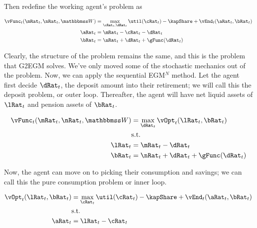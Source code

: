 \documentclass[\econtexRoot/HAFiscal]{subfiles}
\begin{document}
Then redefine the working agent's problem as

\begin{equation}
    \begin{split}
        \vFunc_{t}(\mRat_{t}, \nRat_{t}, \Work) & = \max_{\cRat_{t},
            \dRat_{t}} \util(\cRat_{t})  - \kapShare + \vEnd_{t}(\aRat_{t},
        \bRat_{t}) \\
        \aRat_{t} & = \mRat_{t} - \cRat_{t} - \dRat_{t} \\
        \bRat_{t} & = \nRat_{t} + \dRat_{t} + \gFunc(\dRat_{t}) \\
    \end{split}
\end{equation}



Clearly, the structure of the problem remains the same, and this is the problem
that G2EGM solves. We've only moved some
of the stochastic mechanics out of the problem. Now, we can apply the
sequential EGM$^N$ method. Let the agent first decide $\dRat_{t}$, the deposit
amount into their retirement; we will call this the deposit problem, or outer loop. Thereafter, the
agent will have net liquid assets
of $\lRat_{t}$ and pension assets of $\bRat_{t}$.

\begin{equation}
    \begin{split}
        \vFunc_{t}(\mRat_{t}, \nRat_{t}, \Work) & = \max_{\dRat_{t}}
        \vOpt_{t}(\lRat_{t}, \bRat_{t}) \\
        & \text{s.t.} \\
        \lRat_{t} & = \mRat_{t} - \dRat_{t} \\
        \bRat_{t} & = \nRat_{t} + \dRat_{t} + \gFunc(\dRat_{t})
    \end{split}
\end{equation}

Now, the agent can move on to picking their consumption and savings; we can call this
the pure consumption problem or inner loop.

\begin{equation}
    \begin{split}
        \vOpt_{t}(\lRat_{t}, \bRat_{t}) & = \max_{\cRat_{t}}
        \util(\cRat_{t}) - \kapShare  + \vEnd_{t}(\aRat_{t}, \bRat_{t}) \\
        & \text{s.t.} \\
        \aRat_{t} & = \lRat_{t} - \cRat_{t} \\
    \end{split}
\end{equation}
\end{document}
